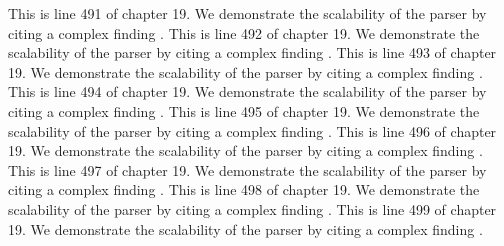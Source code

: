 This is line 491 of chapter 19. We demonstrate the scalability of the parser by citing a complex finding \cite{ref19_491}.
This is line 492 of chapter 19. We demonstrate the scalability of the parser by citing a complex finding \cite{ref19_492}.
This is line 493 of chapter 19. We demonstrate the scalability of the parser by citing a complex finding \cite{ref19_493}.
This is line 494 of chapter 19. We demonstrate the scalability of the parser by citing a complex finding \cite{ref19_494}.
This is line 495 of chapter 19. We demonstrate the scalability of the parser by citing a complex finding \cite{ref19_495}.
This is line 496 of chapter 19. We demonstrate the scalability of the parser by citing a complex finding \cite{ref19_496}.
This is line 497 of chapter 19. We demonstrate the scalability of the parser by citing a complex finding \cite{ref19_497}.
This is line 498 of chapter 19. We demonstrate the scalability of the parser by citing a complex finding \cite{ref19_498}.
This is line 499 of chapter 19. We demonstrate the scalability of the parser by citing a complex finding \cite{ref19_499}.
